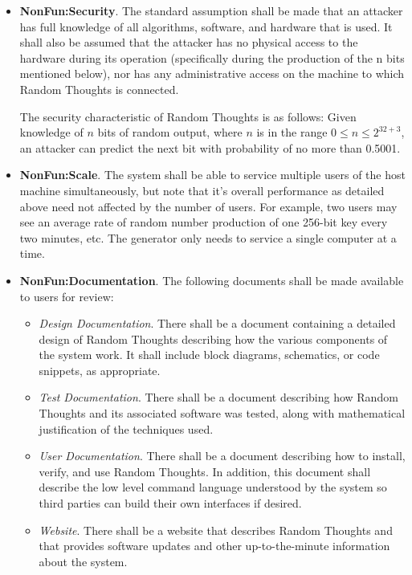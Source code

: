 \begin{itemize}
\item \textbf{NonFun:Security}. The standard assumption shall be made that an attacker has full
  knowledge of all algorithms, software, and hardware that is used. It shall also be assumed
  that the attacker has no physical access to the hardware during its operation (specifically
  during the production of the n bits mentioned below), nor has any administrative access on the
  machine to which Random Thoughts is connected.

  The security characteristic of Random Thoughts is as follows: Given knowledge of $n$ bits of
  random output, where $n$ is in the range $0 \le n \le 2^{32+3}$, an attacker can predict the
  next bit with probability of no more than 0.5001.

\item \textbf{NonFun:Scale}. The system shall be able to service multiple users of the host
  machine simultaneously, but note that it's overall performance as detailed above need not
  affected by the number of users. For example, two users may see an average rate of random
  number production of one 256-bit key every two minutes, etc. The generator only needs to
  service a single computer at a time.

\item \textbf{NonFun:Documentation}. The following documents shall be made available to users
  for review:
  \begin{itemize}
  \item \textit{Design Documentation}. There shall be a document containing a detailed design of
    Random Thoughts describing how the various components of the system work. It shall include
    block diagrams, schematics, or code snippets, as appropriate.
  \item \textit{Test Documentation}. There shall be a document describing how Random Thoughts
    and its associated software was tested, along with mathematical justification of the
    techniques used.
  \item \textit{User Documentation}. There shall be a document describing how to install,
    verify, and use Random Thoughts. In addition, this document shall describe the low level
    command language understood by the system so third parties can build their own interfaces if
    desired.
  \item \textit{Website}. There shall be a website that describes Random Thoughts and that
    provides software updates and other up-to-the-minute information about the system.
  \end{itemize}


\end{itemize}
